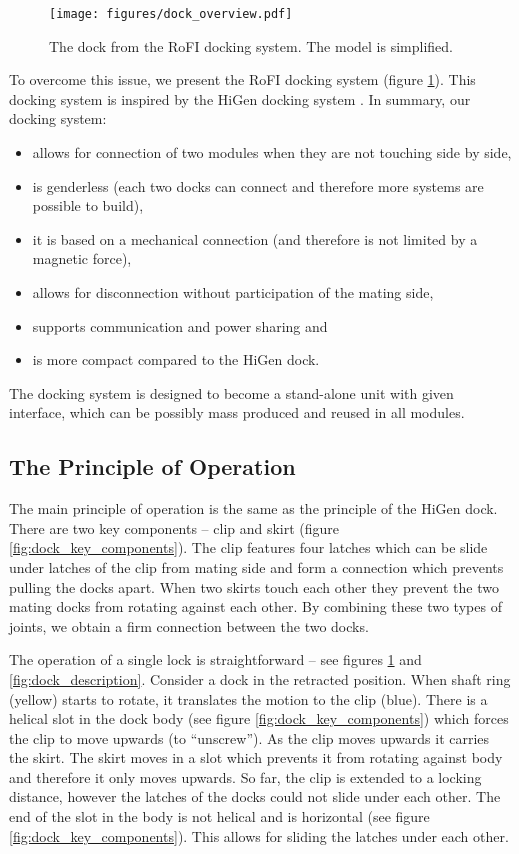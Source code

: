 \begin{figure}[h!]
    \centering
    \texttt{[image: figures/dock\_overview.pdf]}
    \caption{The dock from the RoFI docking system. The model is simplified.}
    \label{fig:dock_overview}
\end{figure}

To overcome this issue, we present the RoFI docking system (figure
\ref{fig:dock_overview}). This docking system is inspired by the HiGen docking
system \cite{parrott_higen:_2014}. In summary, our docking system:
\begin{itemize}
    \item allows for connection of two modules when they are not touching side
    by side,
    \item is genderless (each two docks can connect and therefore more systems
    are possible to build),
    \item it is based on a mechanical connection (and therefore is not limited
    by a magnetic force),
    \item allows for disconnection without participation of the mating side,
    \item supports communication and power sharing and
    \item is more compact compared to the HiGen dock.
\end{itemize}

The docking system is designed to become a stand-alone unit with given
interface, which can be possibly mass produced and reused in all modules.

\subsection{The Principle of Operation}

The main principle of operation is the same as the principle of the HiGen dock.
There are two key components -- clip and skirt (figure
\ref{fig:dock_key_components}). The clip features four latches which can be
slide under latches of the clip from mating side and form a connection which
prevents pulling the docks apart. When two skirts touch each other they prevent
the two mating docks from rotating against each other. By combining these two
types of joints, we obtain a firm connection between the two docks.

The operation of a single lock is straightforward -- see figures
\ref{fig:dock_overview} and \ref{fig:dock_description}. Consider a dock in the
retracted position. When shaft ring (yellow) starts to rotate, it translates the
motion to the clip (blue). There is a helical slot in the dock body (see figure
\ref{fig:dock_key_components}) which forces the clip to move upwards (to
``unscrew''). As the clip moves upwards it carries the skirt. The skirt moves in a
slot which prevents it from rotating against body and therefore it only moves
upwards. So far, the clip is extended to a locking distance, however the latches
of the docks could not slide under each other. The end of the slot in the body
is not helical and is horizontal (see figure \ref{fig:dock_key_components}).
This allows for sliding the latches under each other.

